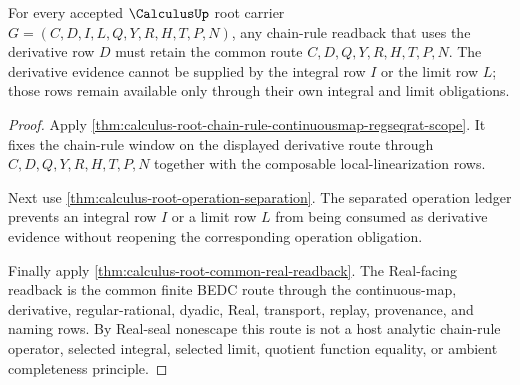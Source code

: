 \begin{theorem}
\label{thm:calculus-root-operation-readback-tail-chain-rule-boundary}
For every accepted $\CalculusUp$ root carrier $G=(C,D,I,L,Q,Y,R,H,T,P,N)$, any chain-rule readback that uses the derivative row $D$ must retain the common route $C,D,Q,Y,R,H,T,P,N$. The derivative evidence cannot be supplied by the integral row $I$ or the limit row $L$; those rows remain available only through their own integral and limit obligations.
\end{theorem}
\begin{proof}
Apply \autoref{thm:calculus-root-chain-rule-continuousmap-regseqrat-scope}. It fixes the chain-rule window on the displayed derivative route through $C,D,Q,Y,R,H,T,P,N$ together with the composable local-linearization rows.

Next use \autoref{thm:calculus-root-operation-separation}. The separated operation ledger prevents an integral row $I$ or a limit row $L$ from being consumed as derivative evidence without reopening the corresponding operation obligation.

Finally apply \autoref{thm:calculus-root-common-real-readback}. The Real-facing readback is the common finite BEDC route through the continuous-map, derivative, regular-rational, dyadic, Real, transport, replay, provenance, and naming rows. By Real-seal nonescape this route is not a host analytic chain-rule operator, selected integral, selected limit, quotient function equality, or ambient completeness principle.
\end{proof}
